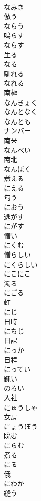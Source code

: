\documentclass[8pt]{extreport}
\begin{document}
\begin{CJK}{UTF8}{min}
\\	なみき	
\\	倣う 
\\	ならう	
\\	鳴らす 
\\	ならす	
\\	生る 
\\	なる	
\\	馴れる 
\\	なれる	
\\	南極 
\\	なんきょく	
\\	なんとなく	
\\	なんとも	
\\	ナンバー	
\\	南米 
\\	なんべい	
\\	南北 
\\	なんぼく	
\\	煮える 
\\	にえる	
\\	匂う 
\\	におう	
\\	逃がす 
\\	にがす	
\\	憎い 
\\	にくむ	
\\	憎らしい 
\\	にくらしい	
\\	にこにこ	
\\	濁る 
\\	にごる	
\\	虹 
\\	にじ	
\\	日時 
\\	にちじ	
\\	日課 
\\	にっか	
\\	日程 
\\	にってい	
\\	鈍い 
\\	のろい	
\\	入社 
\\	にゅうしゃ	
\\	女房 
\\	にょうぼう	
\\	睨む 
\\	にらむ	
\\	煮る 
\\	にる	
\\	俄 
\\	にわか	
\\	縫う 

\end{CJK}
\end{document}
